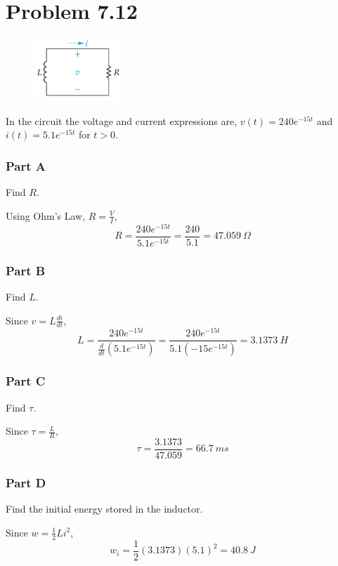 \documentclass[12pt]{article}
\begin{document}
    \section*{Problem 7.12}
    \begin{figure}[h]
        \centering
        \includegraphics[width=0.3\textwidth]{7.12 Figure.png}
    \end{figure}
    \par In the circuit the voltage and current expressions are, $v(t) = 240e^{-15t}$ and $i(t) = 5.1e^{-15t}$ for $t > 0$.
    \subsubsection*{Part A} Find $R$. \\
    \par Using Ohm's Law, $R = \frac{V}{I}$,
    \[
        R = \frac{240e^{-15t}}{5.1e^{-15t}} = \frac{240}{5.1} = \boxed{47.059\ \Omega}
    \]
    \subsubsection*{Part B} Find $L$. \\
    \par Since $v = L \frac{di}{dt}$,
    \[
        L = \frac{240e^{-15t}}{\frac{d}{dt}\left( 5.1e^{-15t} \right) } =
        \frac{240e^{-15t}}{5.1(-15e^{-15t})} = \boxed{3.1373\ H}
    \]
    \subsubsection*{Part C} Find $\tau$. \\
    \par Since $\tau = \frac{L}{R}$,
    \[
        \tau = \frac{3.1373}{47.059} = \boxed{66.7\ ms}
    \]
    \subsubsection*{Part D} Find the initial energy stored in the inductor. \\
    \par Since $w = \frac{1}{2} L i^2$,
    \[
        w_i = \frac{1}{2} (3.1373) (5.1)^2 = \boxed{40.8\ J}
    \]
\end{document}

